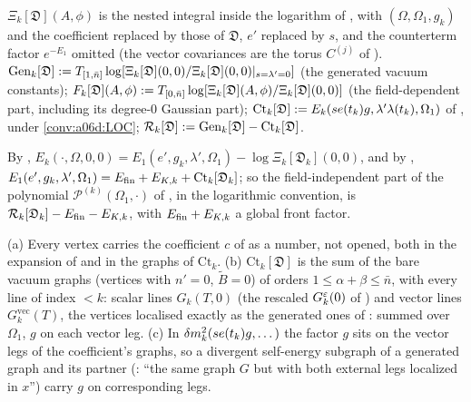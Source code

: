 \begin{definition}\label{def:a06d:V2}
$\Xi_k[\mathfrak D](A,\phi)$ is the nested integral inside the logarithm of \cite[(1.4)]{Ba3}, with $(\Omega,\Omega_1,g_k)$ and the coefficient replaced by those of $\mathfrak D$, $e'$ replaced by $s$, and the counterterm factor $e^{-E_1}$ omitted (the vector covariances are the torus $C^{(j)}$ of \cite[(1.4)]{Ba3}). $\mathrm{Gen}_k[\mathfrak D]:= T_{[1,\bar n]}\log[\Xi_k[\mathfrak D](0,0)/\Xi_k[\mathfrak D](0,0)|_{s=\lambda'=0}]$ (the generated vacuum constants); $F_k[\mathfrak D](A,\phi):= T_{[0,\bar n]}\log[\Xi_k[\mathfrak D](A,\phi)/\Xi_k[\mathfrak D](0,0)]$ (the field-dependent part, including its degree-$0$ Gaussian part); $\mathrm{Ct}_k[\mathfrak D]:= E_k(se(t_k)g,\lambda'\lambda(t_k),\Omega_1)$ of \cite[(1.30)]{Ba3}, under \cref{conv:a06d:LOC}; $\mathcal R_k[\mathfrak D]:=\mathrm{Gen}_k[\mathfrak D]-\mathrm{Ct}_k[\mathfrak D]$.
\end{definition}

By \cite[(1.4)]{Ba3}, $E_k(\cdot,\Omega,0,0)=E_1(e',g_k,\lambda',\Omega_1)-\log\Xi_k[\mathfrak D_k](0,0)$, and by \cite[(1.30)]{Ba3}, $E_1(e',g_k,\lambda',\Omega_1)=E_{\mathrm{fin}}+E_{K,k}+\mathrm{Ct}_k[\mathfrak D_k]$; so the field-independent part of the polynomial $\mathcal P^{(k)}(\Omega_1,\cdot)$ of \cite[(1.5)]{Ba3}, in the logarithmic convention, is $\mathcal R_k[\mathfrak D_k]-E_{\mathrm{fin}}-E_{K,k}$, with $E_{\mathrm{fin}}+E_{K,k}$ a global front factor.

\begin{convention}\label{conv:a06d:LOC}
\textup{(a)} Every vertex \cite[(1.7)]{Ba3} carries the coefficient $c$ of \cite[(1.29)]{Ba3} as a number, not opened, both in the expansion of \cite[(1.4)]{Ba3} and in the graphs of $\mathrm{Ct}_k$. \textup{(b)} $\mathrm{Ct}_k[\mathfrak D]$ is the sum of the bare vacuum graphs (vertices \cite[(1.6), (1.7), (1.8), (1.10)]{Ba3} with $n'=0$, $\tilde B=0$) of orders $1\le\alpha+\beta\le\bar n$, with every line of index $<k$: scalar lines $G_k(T,0)$ (the rescaled $G^{\varepsilon}_k(0)$ of \cite[(1.25)--(1.28)]{Ba3}) and vector lines $G^{\mathrm{vec}}_k(T)$, the vertices localised exactly as the generated ones of \cite[(1.4)]{Ba3}: \cite[(1.6)--(1.7)]{Ba3} summed over $\Omega_1$, $g$ on each vector leg. \textup{(c)} In $\delta m^2_k(se(t_k)g,\dots)$ the factor $g$ sits on the vector legs of the coefficient's graphs, so a divergent self-energy subgraph of a generated graph and its \cite[(1.7)]{Ba3} partner (\cite[p.~420]{Ba3}: ``the same graph $G$ but with both external legs localized in $x$'') carry $g$ on corresponding legs.
\end{convention}

